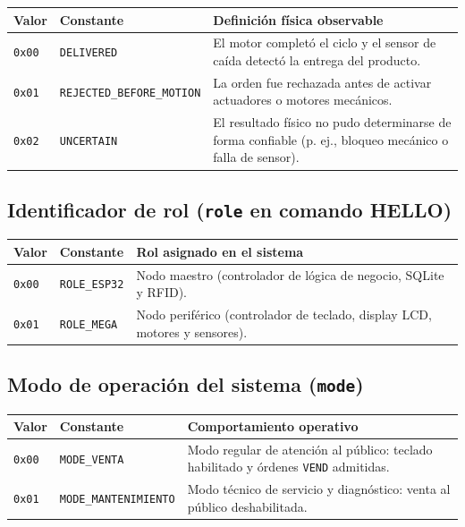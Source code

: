 \documentclass[a4paper,11pt]{article}
\newcommand{\tablehead}[1]{\cellcolor{SAIDBlue}\color{white}\textbf{#1}}
\begin{document}
\noindent\begin{tabularx}{\textwidth}{|p{1.8cm}|p{5.0cm}|X|}
    \hline
    \tablehead{Valor} & \tablehead{Constante} & \tablehead{Definición física observable} \\
    \hline
    \texttt{0x00} & \texttt{DELIVERED} & El motor completó el ciclo y el sensor de caída detectó la entrega del producto. \\
    \hline
    \texttt{0x01} & \texttt{REJECTED\_BEFORE\_MOTION} & La orden fue rechazada antes de activar actuadores o motores mecánicos. \\
    \hline
    \texttt{0x02} & \texttt{UNCERTAIN} & El resultado físico no pudo determinarse de forma confiable (p. ej., bloqueo mecánico o falla de sensor). \\
    \hline
\end{tabularx}

\subsection{Identificador de rol (\texttt{role} en comando HELLO)}

\noindent\begin{tabularx}{\textwidth}{|p{1.8cm}|p{3.2cm}|X|}
    \hline
    \tablehead{Valor} & \tablehead{Constante} & \tablehead{Rol asignado en el sistema} \\
    \hline
    \texttt{0x00} & \texttt{ROLE\_ESP32} & Nodo maestro (controlador de lógica de negocio, SQLite y RFID). \\
    \hline
    \texttt{0x01} & \texttt{ROLE\_MEGA} & Nodo periférico (controlador de teclado, display LCD, motores y sensores). \\
    \hline
\end{tabularx}

\subsection{Modo de operación del sistema (\texttt{mode})}

\noindent\begin{tabularx}{\textwidth}{|p{1.8cm}|p{4.5cm}|X|}
    \hline
    \tablehead{Valor} & \tablehead{Constante} & \tablehead{Comportamiento operativo} \\
    \hline
    \texttt{0x00} & \texttt{MODE\_VENTA} & Modo regular de atención al público: teclado habilitado y órdenes \texttt{VEND} admitidas. \\
    \hline
    \texttt{0x01} & \texttt{MODE\_MANTENIMIENTO} & Modo técnico de servicio y diagnóstico: venta al público deshabilitada. \\
    \hline
\end{tabularx}
\end{document}

